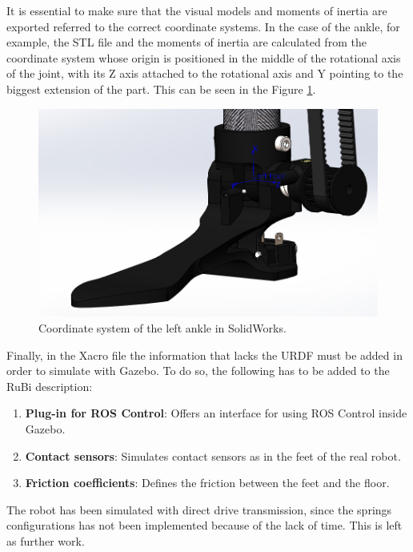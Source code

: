 It is essential to make sure that the visual models and moments of inertia are exported referred to the correct coordinate systems.
In the case of the ankle, for example, the STL file and the moments of inertia are calculated from the coordinate system whose origin is positioned in the middle of the rotational axis of the joint, with its Z axis attached to the rotational axis and Y pointing to the biggest extension of the part.
This can be seen in the Figure \ref{fig:solidworks_ankle_coodinate_system}.

\begin{figure}[ht!]
  \centering
  \includegraphics[width=0.75\linewidth]{figures/solidworks_ankle_coordinate_system}
  \caption{Coordinate system of the left ankle in SolidWorks.}
  \label{fig:solidworks_ankle_coodinate_system}
\end{figure}

Finally, in the Xacro file the information that lacks the URDF must be added in order to simulate with Gazebo.
To do so, the following has to be added to the RuBi description:
\begin{enumerate}
  \item \textbf{Plug-in for ROS Control}: Offers an interface for using ROS Control inside Gazebo.
  \item \textbf{Contact sensors}: Simulates contact sensors as in the feet of the real robot.
  \item \textbf{Friction coefficients}: Defines the friction between the feet and the floor.
\end{enumerate}

The robot has been simulated with direct drive transmission, since the springs configurations has not been implemented because of the lack of time.
This is left as further work.

